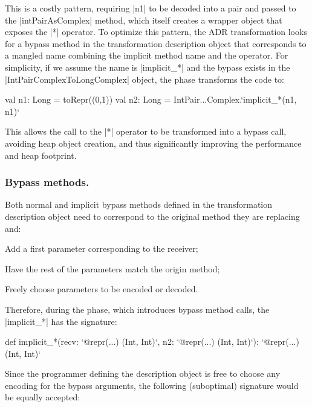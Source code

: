 This is a costly pattern, requiring |n1| to be decoded into a pair and passed to the |intPairAsComplex| method, which itself creates a wrapper object that exposes the |*| operator. To optimize this pattern, the ADR transformation looks for a bypass method in the transformation description object that corresponds to a mangled name combining the implicit method name and the operator. For simplicity, if we assume the name is |implicit_*| and the bypass exists in the |IntPairComplexToLongComplex| object, the \coerce{} phase transforms the code to:

\begin{lstlisting-nobreak}
val n1: Long = toRepr((0,1))
val n2: Long = IntPair...Complex.`implicit_*(n1, n1)`
\end{lstlisting-nobreak}

This allows the call to the |*| operator to be transformed into a bypass call, avoiding heap object creation, and thus significantly improving the performance and heap footprint. %

\vspace{-0.4em}
\subsubsection{Bypass methods.} Both normal and implicit bypass methods defined in the transformation description object need to correspond to the original method they are replacing and:

\begin{compactitem}
\item Add a first parameter corresponding to the receiver;
\item Have the rest of the parameters match the origin method;
\item Freely choose parameters to be encoded or decoded.
\end{compactitem}

Therefore, during the \coerce{} phase, which introduces bypass method calls, the |implicit_*| has the signature:

\begin{lstlisting-nobreak}
def implicit_*(recv: `@repr(...) (Int, Int)`,  n2: `@repr(...) (Int, Int)`): `@repr(...) (Int, Int)`
\end{lstlisting-nobreak}

Since the programmer defining the description object is free to choose any encoding for the bypass arguments, the following (suboptimal) signature would be equally accepted:

